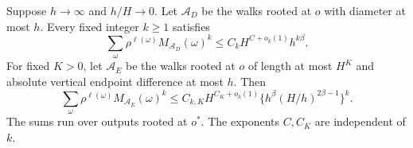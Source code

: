 \begin{lemma}\label{R:alt:g:multiplicity}
Suppose $h\to\infty$ and $h/H\to0$. Let $\mathcal A_D$ be the walks
rooted at $o$ with diameter at most $h$. Every fixed integer $k\ge1$
satisfies
\begin{equation}\label{R:alt:g:diameter-moment}
 \sum_\omega\rho^{\ell(\omega)}M_{\mathcal A_D}(\omega)^k
       \le C_k H^{C+o_k(1)}h^{k\beta}.
\end{equation}
For fixed $K>0$, let $\mathcal A_E$ be the walks rooted at $o$ of length
at most $H^K$ and absolute vertical endpoint difference at most $h$.
Then
\begin{equation}\label{R:alt:g:endpoint-moment}
 \sum_\omega\rho^{\ell(\omega)}M_{\mathcal A_E}(\omega)^k
 \le C_{k,K}H^{C_K+o_k(1)}
             \{h^\beta(H/h)^{2\beta-1}\}^{k}.
\end{equation}
The sums run over outputs rooted at $o^*$. The exponents $C,C_K$ are
independent of $k$.
\end{lemma}
